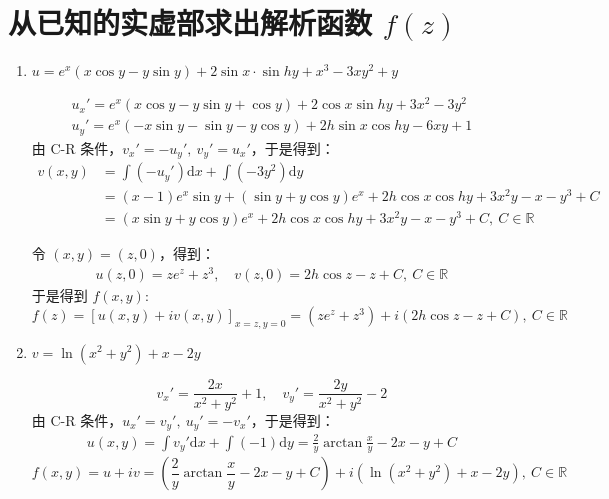 \documentclass[UTF8]{report}
\def\R{\mathbb{R}}
\theoremstyle{MyLineTheoremStyle} %
\theoremstyle{MyBlockTheoremStyle} %
\theoremstyle{MySubsubsectionStyle} %
\begin{document}
\section{从已知的实虚部求出解析函数 $f(z)$}

\begin{enumerate}
\item $u = e^x(x\cos y - y\sin y) + 2\sin x \cdot \sin hy + x^3 - 3xy^2 +y$

\begin{gather}
u_x' = e^x(x\cos y -y\sin y + \cos y) + 2\cos x \sin hy +3x^2 - 3y^2 \\ 
u_y' = e^x(-x\sin y - \sin y - y\cos y ) + 2h \sin x \cos hy - 6xy +1
\end{gather}
由 C-R 条件，$v_x' = -u_y',\ v_y' = u_x'$，于是得到：
\begin{align}
v(x,y) 
&= \int (-u_y')\mathrm{d}x + \int (-3y^2) \mathrm{d}y \\
&= (x-1)e^x\sin y  + (\sin y +y \cos y) e^x + 2h \cos x \cos hy + 3x^2y - x - y^3 + C\\ 
&= (x\sin y + y\cos y)e^x + 2h\cos x \cos hy + 3x^2y -x -y^3 + C,\ C \in \R
\end{align}

令 $(x,y) = (z,0)$，得到：
\begin{gather}
u(z,0) = ze^z + z^3,\quad v(z,0) = 2h\cos z - z +C,\ C \in \R
\end{gather}
于是得到 $f(x,y)$:
\begin{equation}
f(z) = \left[u(x,y) + iv(x,y)\right]_{x=z,y=0}
= 
(ze^z + z^3) + i(2h\cos z -z +C),\ C \in \R
\end{equation}


\item $v = \ln (x^2 + y^2) + x -2y$

\begin{equation}
v_x' = \frac{2x}{x^2 + y^2} + 1, \quad v_y' = \frac{2y}{x^2 + y^2} -2
\end{equation}
由 C-R 条件，$u_x' = v_y',\ u_y' = -v_x'$，于是得到：
\begin{align}
u(x,y) 
= \int v_y' \mathrm{d}x +  \int (-1)\mathrm{d}y = \frac{2}{y}\arctan \frac{x}{y} - 2x -y + C
\end{align}
\begin{equation}
f(x,y) = u + iv = (\frac{2}{y}\arctan \frac{x}{y} - 2x -y + C) + i(\ln (x^2 + y^2) + x -2y),\ C \in \R
\end{equation}
\end{enumerate}
\end{document}
